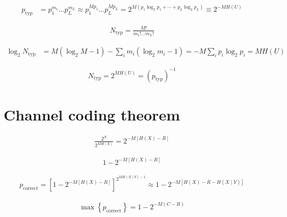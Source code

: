 \documentclass{article}
\begin{document}
\begin{align*}
p_{\text{typ}} &= p_{1}^{m_{1}} \ldots p_{L}^{m_{L}} \approx p_{1}^{M p_{1}} \ldots p_{L}^{M p_{L}} = 2^{M \left(p_{1} \log_2 p_{1} + \cdots + p_{L} \log_2 p_{L}\right)} \equiv 2^{-M H(U)} 
\tag{C.32}
\end{align*}

\begin{align*}
N_{\mathrm{typ}} = \frac{M!}{m_{1}! \ldots m_{L}!} 
\tag{C.33}
\end{align*}

\begin{align*}
\log_2 N_{\text{typ}} &= M\left(\log_2 M - 1\right) - \sum_{i} m_{i} \left(\log_2 m_{i} - 1\right) = -M \sum_{i} p_{i} \log_2 p_{i} = M H(U) 
\tag{C.34}
\end{align*}

\begin{align*}
N_{\text{typ}} = 2^{M H(U)} = \left(p_{\text{typ}}\right)^{-1} 
\tag{C.35}
\end{align*}

\section{Channel coding theorem}
\begin{align*}
\frac{2^N}{2^{M H(X)}} = 2^{-M[H(X) - R]} 
\tag{C.36}
\end{align*}

\begin{align*}
1 - 2^{-M[H(X) - R]} 
\tag{C.37}
\end{align*}

\begin{align*}
p_{\text{correct}} = \left[1 - 2^{-M[H(X) - R]} \right]^{2^{M H(X \mid Y) - 1}} \approx 1 - 2^{-M[H(X) - R - H(X \mid Y)]}
\tag{C.38}
\end{align*}

\begin{align*}
\max \left\{p_{\text{correct}}\right\} = 1 - 2^{-M(C - R)} 
\tag{C.39}
\end{align*}
\end{document}
